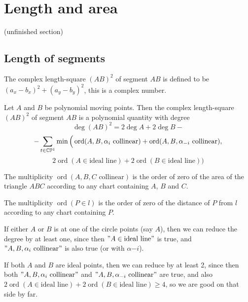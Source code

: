 \documentclass[a4paper]{article}
\newcommand{\ord}{\operatorname{ord}}
\begin{document}
\section{Length and area}
(unfinished section)
\subsection{Length of segments}

\begin{definition}
     The complex length-square $(AB)^2$ of segment $AB$ is defined to be $(a_x-b_x)^2+(a_y-b_y)^2$, this is a complex number.
\end{definition}

\begin{theorem}
    Let $A$ and $B$ be polynomial moving points. Then the complex length-square $(AB)^2$ of segment $AB$ is a polynomial quantity with degree
    $$\deg (AB)^2=2\deg A+2\deg B-$$
    $$-\sum_{t\in\cc\pp^1}\min\Big(\ord(A,B,\alpha_i\text{ collinear})+\ord(A,B,\alpha_{-i}\text{ collinear}),$$
    $$2\ord(A\in \text{ideal line})+2\ord(B\in \text{ideal line})\Big)$$
\end{theorem}
\begin{remark}
    The multiplicity $\ord(A,B,C\text{ collinear})$ is the order of zero of the area of the triangle $ABC$ according to any chart containing $A$, $B$ and $C$.
    
    The multiplicity $\ord(P\in l)$ is the order of zero of the distance of $P$ from $l$ according to any chart containing $P$.
\end{remark}
\begin{remark}
    If either $A$ or $B$ is at one of the circle points (say $A$), then we can reduce the degree by at least one, since then $"A\in \text{ideal line}"$ is true, and $"A,B,\alpha_i\text{ collinear}"$ is also true (or with $\alpha{-i}$).

    If both $A$ and $B$ are ideal points, then we can reduce by at least 2, since then both $"A,B,\alpha_i\text{ collinear}"$ and $"A,B,\alpha_{-i}\text{ collinear}"$ are true, and also $2\ord(A\in \text{ideal line})+2\ord(B\in \text{ideal line})\ge 4$, so we are good on that side by far.
\end{remark}
\end{document}
